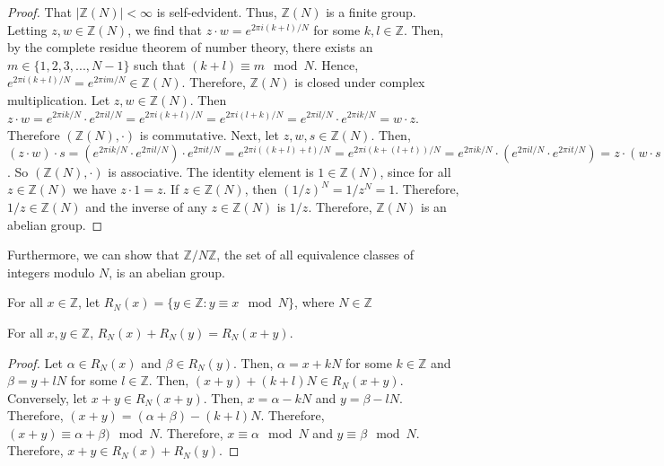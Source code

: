 \documentclass[../article.tex]{subfiles}
\begin{document}
\begin{proof}
That $| \mathbb{Z}(N)| < \infty$ is self-edvident. Thus, $\mathbb{Z}(N)$ is a finite group. Letting $z,w \in \mathbb{Z}(N)$, we find that $z \cdot w = e^{2 \pi i (k+l)/N}$ for some $k,l \in \mathbb{Z}$. Then, by the complete residue theorem of number theory, there exists an $m \in \{1, 2, 3, ..., N-1\}$ such that $(k+l) \equiv m \mod N$. Hence, $e^{2 \pi i (k+l)/N} = e^{2 \pi i m/N} \in \mathbb{Z}(N)$. Therefore, $\mathbb{Z}(N)$ is closed under complex multiplication. Let $z,w \in \mathbb{Z}(N)$. Then $z \cdot w = e^{2 \pi i k/N} \cdot e^{2 \pi i l/N} = e^{2 \pi i (k+l)/N} = e^{2 \pi i (l+k)/N} = e^{2 \pi i l/N} \cdot e^{2 \pi i k/N} = w \cdot z$. Therefore $(\mathbb{Z}(N), \cdot)$ is commutative. Next, let $z,w,s \in \mathbb{Z}(N)$. Then, $(z \cdot w) \cdot s = (e^{2 \pi i k/N} \cdot e^{2 \pi i l/N}) \cdot e^{2 \pi i t/N} = e^{2 \pi i ((k+l)+t)/N} = e^{2 \pi i (k+(l+t))/N} = e^{2 \pi i k/N} \cdot (e^{2 \pi i l/N} \cdot e^{2 \pi i t/N}) = z \cdot (w \cdot s)$. So $(\mathbb{Z}(N), \cdot)$ is associative. The identity element is $1 \in \mathbb{Z}(N)$, since for all $z \in \mathbb{Z}(N)$ we have $z \cdot 1 = z$. If $z \in \mathbb{Z}(N)$, then $(1/z)^N = 1/ z^N = 1$. Therefore, $1/z \in \mathbb{Z}(N)$ and the inverse of any $z \in \mathbb{Z}(N)$ is $1/z$. Therefore, $\mathbb{Z}(N)$ is an abelian group.
\end{proof}

Furthermore, we can show that $\mathbb{Z}/ N\mathbb{Z}$, the set of all equivalence classes of integers modulo $N$, is an abelian group.

\begin{definition}
For all $x \in \mathbb{Z}$, let $R_N (x) = \{y \in \mathbb{Z} : y \equiv x   \mod   N\}$, where $N \in \mathbb{Z}$
\end{definition}
\begin{theorem}
For all $x,y \in \mathbb{Z}$, $R_N (x) + R_N (y) = R_N (x+y).$
\end{theorem}
\begin{proof}
Let $\alpha \in R_N (x)$ and $\beta \in R_N (y)$. Then, $\alpha = x +kN$ for some $k \in \mathbb{Z}$ and $\beta = y + lN$ for some $l \in \mathbb{Z}$. Then, $(x+y)+(k+l)N \in R_N (x+y)$. Conversely, let $x+y \in R_N (x+y)$. Then, $x = \alpha -kN$ and $y = \beta -lN$. Therefore, $(x+y) = (\alpha + \beta) -(k+l)N$. Therefore, $(x+y) \equiv \alpha +\beta) \mod N$. Therefore, $x \equiv \alpha \mod N$ and $y \equiv \beta \mod N$. Therefore, $x+y \in R_N (x) + R_N (y)$.
\end{proof}
\end{document}
